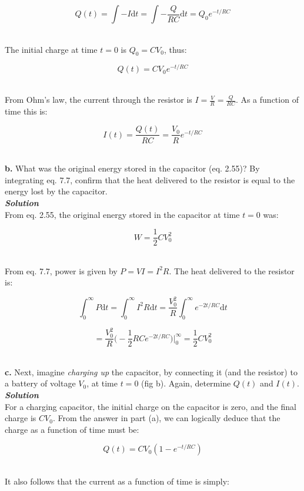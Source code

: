 \documentclass[9pt]{extarticle}
\newcommand{\bfit}[1]{\textbf{\textit{#1}}}
\renewcommand{\d}{\text{d}}
\begin{document}
\begin{multicols*}{2}
$$Q(t) = \int -I \d t=  \int -\frac{Q}{RC} \d t = Q_0 e^{-t/RC}$$ \ 

The initial charge at time $t=0$ is $Q_0 = CV_0$, thus:

$$Q(t) = CV_0 e^{-t/RC}$$ \ 

From Ohm's law, the current through the resistor is $I = \frac VR = \frac{Q}{RC}$. As a function of time this is:

$$I(t) = \frac{Q(t)}{RC} = \frac{V_0}{R} e^{-t/RC}$$ \ 



\dotfill 

\hfill 

{\Large \bf b.} What was the original energy stored in the capacitor (eq. 2.55)? By integrating eq. 7.7, confirm that the heat delivered to the resistor is equal to the energy lost by the capacitor. \\ 

{\bfit{Solution}} \\ 

From eq. 2.55, the original energy stored in the capacitor at time $t=0$ was:

$$W = \frac 12 CV_0^2$$ \ 

From eq. 7.7, power is given by $P = VI = I^2 R$. The heat delivered to the resistor is:

$$\int_0^\infty P \d t = \int_0^\infty I^2 R \d t = \frac{V_0^2}{R} \int_0^\infty e^{-2t/RC} \d t$$

$$= \frac{V_0^2}{R} \bigg( -\frac 12 RC e^{-2t/RC} \bigg) \bigg|_0^\infty = \frac 12 CV_0^2$$ \ 



\dotfill 

\hfill 

{\Large \bf c.} Next, imagine {\it charging up} the capacitor, by connecting it (and the resistor) to a battery of voltage $V_0$, at time $t=0$ (fig b). Again, determine $Q(t)$ and $I(t)$. \\  

{\bfit{Solution}} \\ 

For a charging capacitor, the initial charge on the capacitor is zero, and the final charge is $CV_0$. From the answer in part (a), we can logically deduce that the charge as a function of time must be:

$$Q(t) = CV_0(1 - e^{-t/RC})$$ \ 

It also follows that the current as a function of time is simply:


\end{multicols*}
\end{document}

